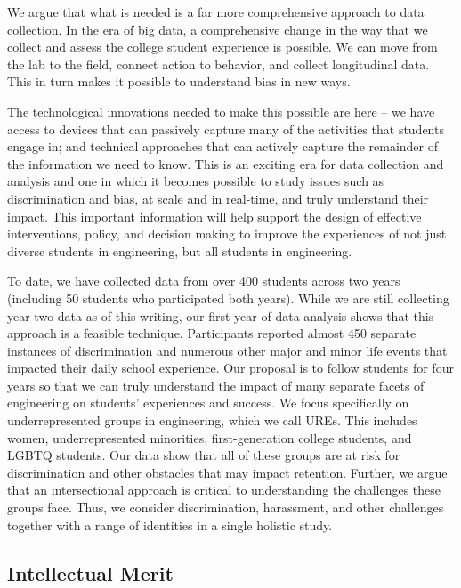 We argue that what is needed is a far more comprehensive approach to data collection. In the era of big data, a comprehensive change in the way that we collect and assess the college student experience is possible. We can  move from the lab to the field,  connect action to behavior, and  collect longitudinal data. This in turn makes it possible to understand bias in  new ways.  

The technological innovations needed to make this possible are here -- we have access to devices that can passively capture many of the activities that students engage in; and technical approaches that can actively capture the remainder of the information we need to know. This is an exciting era for data collection and analysis and one in which it becomes possible to study issues such as discrimination and bias, at scale and in real-time, and truly understand their impact. This important information will help support the design of effective interventions, policy, and decision making to improve the experiences of not just diverse students in engineering, but all students in engineering. 
 
To date, we have collected data from over 400 students across two years (including 50 students who participated both years). While we are still collecting year two data as of this writing, our first year of data analysis  shows that this approach is a feasible technique. Participants reported almost 450 separate instances of discrimination and numerous other major and minor life events that impacted their daily school experience. Our proposal is to follow students for four years so that we can truly understand the impact of many separate facets of engineering on students’ experiences and success. We focus specifically on underrepresented groups in engineering, which we call UREs. This includes women, underrepresented minorities, first-generation college students, and LGBTQ students. Our  data show that all of these groups are at risk for discrimination and other obstacles that may impact retention. Further, we argue that an intersectional approach is critical to understanding the challenges these groups face. Thus, we consider discrimination, harassment, and other challenges together with a range of identities in a single holistic study.  
 

\subsection{Intellectual Merit}
\label{sec:questions}

